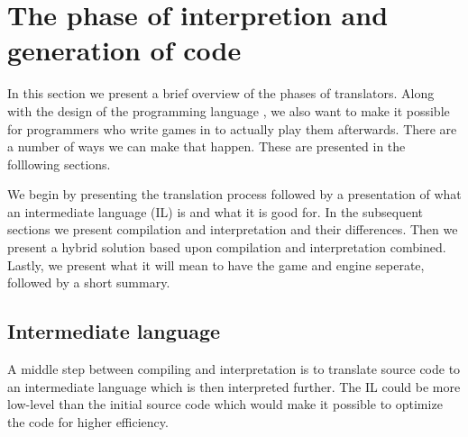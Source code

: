 \section{The phase of interpretion and generation of code}
\label{sec:codegenerationandinterpretation}

In this section we present a brief overview of the phases of translators. Along with the design of the programming
language \productname{}, we also want to make it possible for programmers who
write games in \productname{} to actually play them afterwards. There are a
number of ways we can make that happen. These are presented in the folllowing
sections. 

We begin by presenting the translation process followed by a presentation of
what an intermediate language (IL) is and what it is good for. In the subsequent
sections we present compilation and interpretation and their differences. Then
we present a hybrid solution based upon compilation and interpretation combined.
Lastly, we present what it will mean to have the game and engine seperate,
followed by a short summary.



%

\subsection{Intermediate language}
\label{sec:intermediatelanguage}
A middle step between compiling and interpretation is to translate source code to an
intermediate language which is then interpreted further. The IL could be more
low-level than the initial source code which would make it possible to optimize the code for higher
efficiency.

